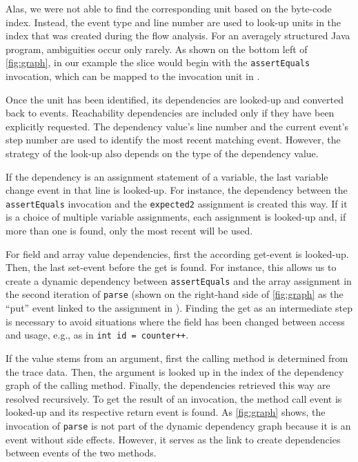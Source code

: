 Alas, we were not able to find the corresponding unit based on the byte-code index.
Instead, the event type and line number are used to look-up units in the index that was created during the flow analysis.
For an averagely structured Java program, ambiguities occur only rarely.
As shown on the bottom left of \autoref{fig:graph}, in our example the slice would begin with the \verb+assertEquals+ invocation, which can be mapped to the invocation unit in .

Once the unit has been identified, its dependencies are looked-up and converted back to events.
Reachability dependencies are included only if they have been explicitly requested.
The dependency value's line number and the current event's step number are used to identify the most recent matching event.
However, the strategy of the look-up also depends on the type of the dependency value.

If the dependency is an assignment statement of a variable, the last variable change event in that line is looked-up.
For instance, the dependency between the \verb+assertEquals+ invocation and the \verb+expected2+ assignment is created this way.
If it is a choice of multiple variable assignments, each assignment is looked-up and, if more than one is found, only the most recent will be used.

For field and array value dependencies, first the according get-event is looked-up.
Then, the last set-event before the get is found.
For instance, this allows us to create a dynamic dependency between \verb+assertEquals+ and the array assignment in the second iteration of \verb+parse+ (shown on the right-hand side of \autoref{fig:graph} as the ``put'' event linked to the assignment in ).
Finding the get as an intermediate step is necessary to avoid situations where the field has been changed between access and usage, e.g., as in \verb/int id = counter++/.

If the value stems from an argument, first the calling method is determined from the trace data. 
Then, the argument is looked up in the index of the dependency graph of the calling method.
Finally, the dependencies retrieved this way are resolved recursively.
To get the result of an invocation, the method call event is looked-up and its respective return event is found.
As \autoref{fig:graph} shows, the invocation of \verb+parse+ is not part of the dynamic dependency graph because it is an event without side effects.
However, it serves as the link to create dependencies between events of the two methods.

